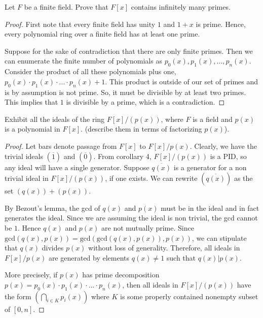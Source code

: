 \documentclass[10pt]{article}
\newenvironment{problem}[2][Problem]{\begin{trivlist}
		\item[\hskip \labelsep {\bfseries #1}\hskip \labelsep {\bfseries #2.}]}{\end{trivlist}}
\begin{document}
	\begin{problem}{2.4}
		Let $F$ be a finite field. Prove that $F[x]$ contains infinitely many primes.
		\begin{proof}
			First note that every finite field has unity $1$ and $1+x$ is prime. Hence, every polynomial ring over a finite field has at least one prime. 
			
			Suppose for the sake of contradiction that there are only finite primes. Then we can enumerate the finite number of polynomials as $p_0(x), p_1(x), ..., p_n(x)$. Consider the product of all these polynomials plus one, $p_0(x) \cdot p_1(x) \cdot ... \cdot p_n(x) + 1$. This product is outside of our set of primes and is by assumption is not prime. So, it must be divisible by at least two primes. This implies that $1$ is divisible by a prime, which is a contradiction. 
		\end{proof}
	\end{problem}
	
	\begin{problem}{2.5}
		Exhibit all the ideals of the ring $F[x]/(p(x))$, where $F$ is a field and $p(x)$ is a polynomial in $F[x]$. (describe them in terms of factorizing $p(x)$).
		\begin{proof}
			Let bars denote passage from $F[x]$ to $F[x]/p(x)$. Clearly, we have the trivial ideals $(\overline{1})$ and $(\overline{0})$. From corollary 4, $F[x]/(p(x))$ is a PID, so any ideal will have a single generator. Suppose $\overline{q(x)}$ is a generator for a non trivial ideal in $F[x]/(p(x))$, if one exists. We can rewrite $(\overline{q(x)})$ as the set $(q(x)) + (p(x))$. 
			
			By Bezout's lemma, the gcd of $q(x)$ and $p(x)$ must be in the ideal and in fact generates the ideal. Since we are assuming the ideal is non trivial, the gcd cannot be $1$. Hence $q(x)$ and $p(x)$ are not mutually prime. Since $\text{gcd}(q(x), p(x)) = \text{gcd}(\text{gcd}(q(x), p(x)), p(x))$, we can stipulate that $q(x)$ divides $p(x)$ without loss of generality. Therefore, all ideals in $F[x]/p(x)$ are generated by elements $q(x) \not = 1$ such that $q(x)|p(x)$.
			
			More precisely, if $p(x)$ has prime decomposition $p(x) = p_0(x) \cdot p_1(x) \cdot ... \cdot p_n(x)$, then all ideals in $F[x]/(p(x))$ have the form $(\bigcap_{i\in K} p_i(x))$ where $K$ is some properly contained nonempty subset of $[0,n]$.
		\end{proof}
	\end{problem}
	
\end{document}
